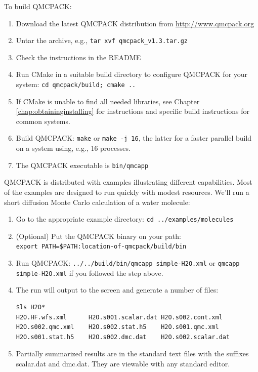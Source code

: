 To build QMCPACK:

\begin{enumerate}
\item Download the latest QMCPACK distribution from
  \url{http://www.qmcpack.org}
\item Untar the archive, e.g., \texttt{tar xvf
    qmcpack\_v1.3.tar.gz}
\item Check the instructions in the README
\item Run CMake in a suitable build directory to configure QMCPACK for
  your system: \texttt{cd
    qmcpack/build; cmake ..}
\item If CMake is unable to find all needed libraries, see Chapter
  \ref{chap:obtaininginstalling} for instructions and specific build
  instructions for common systems.
\item Build QMCPACK: \texttt{make} or \texttt{make -j 16}, the latter
  for a faster parallel build on a system using, e.g., 16 processes.
\item The QMCPACK executable is \texttt{bin/qmcapp}
\end{enumerate}

QMCPACK is distributed with examples illustrating different
capabilities. Most of the examples are designed to run quickly with
modest resources. We'll run a short diffusion Monte Carlo calculation
of a water molecule:

\begin{enumerate}
\item Go to the appropriate example directory: \texttt{cd
    ../examples/molecules}
\item (Optional) Put the QMCPACK binary on your path:\\ \texttt{export PATH=\$PATH:location-of-qmcpack/build/bin}
\item Run QMCPACK: \texttt{../../build/bin/qmcapp simple-H2O.xml} or
  \texttt{qmcapp simple-H2O.xml} if you followed the step above.
\item The run will output to the screen and generate a number of files:
\begin{verbatim}
$ls H2O*
H2O.HF.wfs.xml      H2O.s001.scalar.dat H2O.s002.cont.xml
H2O.s002.qmc.xml    H2O.s002.stat.h5    H2O.s001.qmc.xml
H2O.s001.stat.h5    H2O.s002.dmc.dat    H2O.s002.scalar.dat
\end{verbatim}
\item Partially summarized results are in the standard text files with the
  suffixes scalar.dat and dmc.dat. They are viewable with any standard editor.
\end{enumerate}

